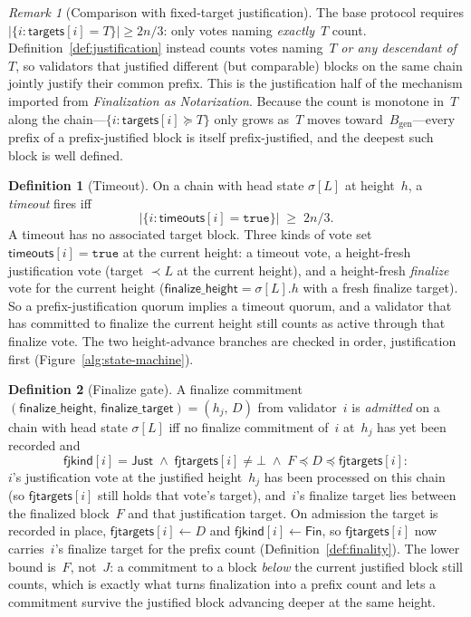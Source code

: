 \ifx\litemode\undefined\documentclass{article}\fi
\newcommand{\genesis}{\ensuremath{B_{\mathrm{gen}}}}
\newcommand{\finalizeHeight}{\mathsf{finalize\_height}}
\newcommand{\finalizeTarget}{\mathsf{finalize\_target}}
\newcommand{\targets}{\mathsf{targets}}
\newcommand{\timeouts}{\mathsf{timeouts}}
\newcommand{\fjtargets}{\mathsf{fjtargets}}
\newcommand{\fjkind}{\mathsf{fjkind}}
\newcommand{\kjust}{\mathsf{Just}}
\newcommand{\kfin}{\mathsf{Fin}}
\theoremstyle{plain}
\theoremstyle{definition}
\newtheorem{definition}{Definition}
\theoremstyle{remark}
\newtheorem{remark}[theorem]{Remark}
\begin{document}
\begin{remark}[Comparison with fixed-target justification]\label{rem:prefix-vs-fixed}
The base protocol requires $|\{i : \targets[i] = T\}| \geq 2n/3$: only votes naming \emph{exactly}~$T$ count.
Definition~\ref{def:justification} instead counts votes naming~$T$ \emph{or any descendant of~$T$}, so validators that justified different (but comparable) blocks on the same chain jointly justify their common prefix.
This is the justification half of the mechanism imported from \emph{Finalization as Notarization}.
Because the count is monotone in~$T$ along the chain---$\{i : \targets[i] \succeq T\}$ only grows as~$T$ moves toward~$\genesis$---every prefix of a prefix-justified block is itself prefix-justified, and the deepest such block is well defined.
\end{remark}

\begin{definition}[Timeout]\label{def:timeout}
On a chain with head state $\sigma[L]$ at height~$h$, a \emph{timeout} fires iff
\[
  \bigl|\{i : \timeouts[i] = \mathtt{true}\}\bigr| \;\geq\; 2n/3.
\]
A timeout has no associated target block.
Three kinds of vote set $\timeouts[i] = \mathtt{true}$ at the current height: a timeout vote, a height-fresh justification vote (target $\prec L$ at the current height), and a height-fresh \emph{finalize} vote for the current height ($\finalizeHeight = \sigma[L].h$ with a fresh finalize target).
So a prefix-justification quorum implies a timeout quorum, and a validator that has committed to finalize the current height still counts as active through that finalize vote.
The two height-advance branches are checked in order, justification first (Figure~\ref{alg:state-machine}).
\end{definition}

\begin{definition}[Finalize gate]\label{def:finalize-gate}
A finalize commitment $(\finalizeHeight,\, \finalizeTarget) = (h_j,\, D)$ from validator~$i$ is \emph{admitted} on a chain with head state $\sigma[L]$ iff no finalize commitment of~$i$ at~$h_j$ has yet been recorded and
\[
  \fjkind[i] = \kjust \;\wedge\; \fjtargets[i] \neq \bot \;\wedge\; F \preceq D \preceq \fjtargets[i] :
\]
$i$'s justification vote at the justified height~$h_j$ has been processed on this chain (so $\fjtargets[i]$ still holds that vote's target), and~$i$'s finalize target lies between the finalized block~$F$ and that justification target.
On admission the target is recorded in place, $\fjtargets[i] \gets D$ and $\fjkind[i] \gets \kfin$, so $\fjtargets[i]$ now carries~$i$'s finalize target for the prefix count (Definition~\ref{def:finality}).
The lower bound is~$F$, not~$J$: a commitment to a block \emph{below} the current justified block still counts, which is exactly what turns finalization into a prefix count and lets a commitment survive the justified block advancing deeper at the same height.
\end{definition}
\end{document}
